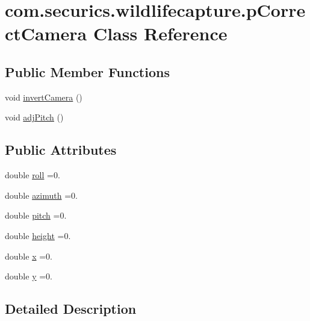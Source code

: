 \hypertarget{classcom_1_1securics_1_1wildlifecapture_1_1p_correct_camera}{\section{com.\+securics.\+wildlifecapture.\+p\+Correct\+Camera Class Reference}
\label{classcom_1_1securics_1_1wildlifecapture_1_1p_correct_camera}
}
\subsection*{Public Member Functions}
\begin{DoxyCompactItemize}
\item 
void \hyperlink{classcom_1_1securics_1_1wildlifecapture_1_1p_correct_camera_a60b80ea9073f5bd3f76d98689f948f42}{invert\+Camera} ()
\item 
void \hyperlink{classcom_1_1securics_1_1wildlifecapture_1_1p_correct_camera_a1966795715d3c67f817425aac498a912}{adj\+Pitch} ()
\end{DoxyCompactItemize}
\subsection*{Public Attributes}
\begin{DoxyCompactItemize}
\item 
double \hyperlink{classcom_1_1securics_1_1wildlifecapture_1_1p_correct_camera_ade8c732e97e38b958251da7e4f6cd9b9}{roll} =0.
\item 
double \hyperlink{classcom_1_1securics_1_1wildlifecapture_1_1p_correct_camera_a5452f71e3ba58bc153e969403ba39e92}{azimuth} =0.
\item 
double \hyperlink{classcom_1_1securics_1_1wildlifecapture_1_1p_correct_camera_a5820d360116f608a4a47416558370931}{pitch} =0.
\item 
double \hyperlink{classcom_1_1securics_1_1wildlifecapture_1_1p_correct_camera_a91990a2db593518b18dd200f8a12458c}{height} =0.
\item 
double \hyperlink{classcom_1_1securics_1_1wildlifecapture_1_1p_correct_camera_a46846caddb75b48e6b53eb3891e29b23}{x} =0.
\item 
double \hyperlink{classcom_1_1securics_1_1wildlifecapture_1_1p_correct_camera_ad1cb4ae4ced9de56b6c63664dac3f070}{y} =0.
\end{DoxyCompactItemize}


\subsection{Detailed Description}


